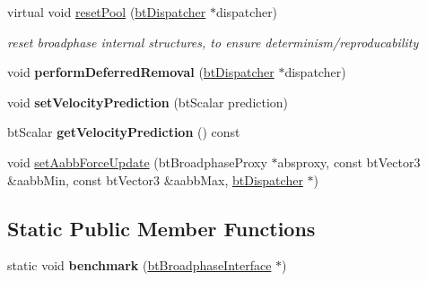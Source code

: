 \begin{DoxyCompactItemize}
\item 
\hypertarget{structbt_dbvt_broadphase_a4d27a2ffb543aa23bb82fcf50ff25341}{virtual void \hyperlink{structbt_dbvt_broadphase_a4d27a2ffb543aa23bb82fcf50ff25341}{reset\+Pool} (\hyperlink{classbt_dispatcher}{bt\+Dispatcher} $\ast$dispatcher)}\label{structbt_dbvt_broadphase_a4d27a2ffb543aa23bb82fcf50ff25341}

\begin{DoxyCompactList}\small\item\em reset broadphase internal structures, to ensure determinism/reproducability \end{DoxyCompactList}\item 
\hypertarget{structbt_dbvt_broadphase_a0312f8146aadca9e83cd22fb10ad3b0e}{void {\bfseries perform\+Deferred\+Removal} (\hyperlink{classbt_dispatcher}{bt\+Dispatcher} $\ast$dispatcher)}\label{structbt_dbvt_broadphase_a0312f8146aadca9e83cd22fb10ad3b0e}

\item 
\hypertarget{structbt_dbvt_broadphase_a21a127eac7b3924751a610eca457f474}{void {\bfseries set\+Velocity\+Prediction} (bt\+Scalar prediction)}\label{structbt_dbvt_broadphase_a21a127eac7b3924751a610eca457f474}

\item 
\hypertarget{structbt_dbvt_broadphase_a2a459875c9351c49fde984256903fd79}{bt\+Scalar {\bfseries get\+Velocity\+Prediction} () const }\label{structbt_dbvt_broadphase_a2a459875c9351c49fde984256903fd79}

\item 
void \hyperlink{structbt_dbvt_broadphase_a645dd617d0bbe7767859f424e2ee18c1}{set\+Aabb\+Force\+Update} (bt\+Broadphase\+Proxy $\ast$absproxy, const bt\+Vector3 \&aabb\+Min, const bt\+Vector3 \&aabb\+Max, \hyperlink{classbt_dispatcher}{bt\+Dispatcher} $\ast$)
\end{DoxyCompactItemize}
\subsection*{Static Public Member Functions}
\begin{DoxyCompactItemize}
\item 
\hypertarget{structbt_dbvt_broadphase_a1a8f0b67c8cc09438d1804e9c3d6867e}{static void {\bfseries benchmark} (\hyperlink{classbt_broadphase_interface}{bt\+Broadphase\+Interface} $\ast$)}\label{structbt_dbvt_broadphase_a1a8f0b67c8cc09438d1804e9c3d6867e}

\end{DoxyCompactItemize}
